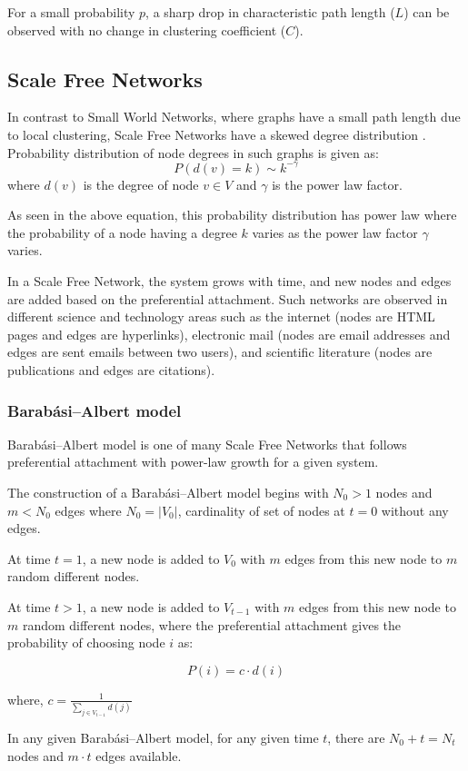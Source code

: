 For a small probability $p$, a sharp drop in characteristic path length ($L$) can be observed with no change in clustering coefficient ($C$).

\subsection{Scale Free Networks}\label{subsection:sfn}
In contrast to Small World Networks, where graphs have a small path length due to local clustering, Scale Free Networks have a skewed degree distribution \cite{aarstad}. Probability distribution of node degrees in such graphs is given as:
\begin{equation}
    P(d(v) = k) \sim k^{-\gamma}
\end{equation}
where $d(v)$ is the degree of node $v \in V$ and $\gamma$ is the power law factor.

As seen in the above equation, this probability distribution has power law where the probability of a node having a degree $k$ varies as the power law factor $\gamma$ varies.

In a Scale Free Network, the system grows with time, and new nodes and edges are added based on the preferential attachment. Such networks are observed in different science and technology areas such as the internet (nodes are HTML pages and edges are hyperlinks), electronic mail (nodes are email addresses and edges are sent emails between two users), and scientific literature (nodes are publications and edges are citations).

\subsubsection{Barabási–Albert model}\label{subsubsection:bamodel}
Barabási–Albert model is one of many Scale Free Networks that follows preferential attachment with power-law growth for a given system.

The construction of a Barabási–Albert model begins with $N_0 > 1$ nodes and $m < N_0$ edges where $N_0 = |V_0|$, cardinality of set of nodes at $t = 0$ without any edges.

At time $t = 1$, a new node is added to $V_0$ with $m$ edges from this new node to $m$ random different nodes.

At time $t > 1$, a new node is added to $V_{t-1}$ with $m$ edges from this new node to $m$ random different nodes, where the preferential attachment gives the probability of choosing node $i$ as:

\begin{equation}
    P(i) = c \cdot d(i)
\end{equation}
\centerline{where, $c = \frac{1}{\sum_{j \in V_{t-1}}d(j)}$}

In any given Barabási–Albert model, for any given time $t$, there are $N_0 + t = N_t$ nodes and $m \cdot t$ edges available.
